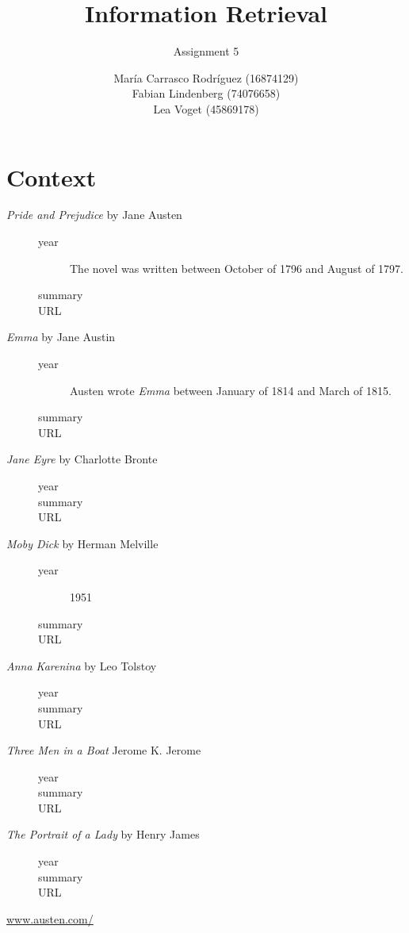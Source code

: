 \documentclass[a4paper,11pt,oneside]{book}
\title{Information Retrieval }
\subtitle{Assignment 5}
\author{ María Carrasco Rodríguez (16874129) \\
		Fabian Lindenberg (74076658)\\
		Lea Voget (45869178)}
\begin{document}
\kostspieligmaketitle


\chapter{Context}
\begin{description}
\item [{\it Pride and Prejudice} by Jane Austen]  
	\begin{description}
	\item [year] The novel was written between October of 1796 and August of 1797.
	\item [summary]
	\item [URL]
	\end{description}
\item [{\it Emma} by Jane Austin]  
	\begin{description}
	\item [year] Austen wrote {\it Emma} between January of 1814 and March of 1815.
	\item [summary]
	\item [URL]
	\end{description}
\item [{\it Jane Eyre} by Charlotte Bronte] 
	\begin{description}
	\item [year]
	\item [summary]
	\item [URL]
	\end{description}
\item [{\it Moby Dick} by Herman Melville]  
	\begin{description}
	\item [year] 1951
	\item [summary]
	\item [URL]
	\end{description}
\item [{\it Anna Karenina} by Leo Tolstoy] 
	\begin{description}
	\item [year]
	\item [summary]
	\item [URL]
	\end{description}
\item [{\it Three Men in a Boat} Jerome K. Jerome] 
	\begin{description}
	\item [year]
	\item [summary]
	\item [URL]
	\end{description}
\item [{\it The Portrait of a Lady} by Henry James] 
	\begin{description}
	\item [year]
	\item [summary]
	\item [URL]
	\end{description}
\end{description}

\pagebreak
\begin{thebibliography}{XXX}
	 \url{www.austen.com/}
\end{thebibliography}
\end{document}
